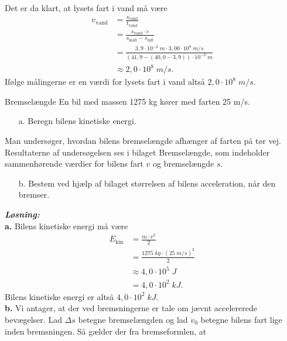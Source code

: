 \documentclass{report}
\newcommand{\sol}{\setlength{\parindent}{0cm}\textbf{\textit{Løsning:}}\setlength{\parindent}{1cm}}
\begin{document}
Det er da klart, at lysets fart i vand må være
\begin{equation*}
\begin{split}
  v _{\text{vand} }&=\frac{s _{\text{vand} }}{t _{\text{vand} }}\\
  &=\frac{s _{\text{vand} } \cdot c}{s _{\text{målt} } - s _{\text{luft} }}\\
  &=\frac{3,9 \cdot 10 ^{-2} \;\unit{m} \cdot 3,00 \cdot 10 ^{8} \;\unit{m/s} }{ \left(41,9 - (40,0-3,9)\right) \cdot 10 ^{-2}\;\unit{m} }\\
  &\approx 2,0 \cdot 10 ^{8} \;\unit{m/s}.
\end{split}
\end{equation*}
Ifølge målingerne er en værdi for lysets fart i vand altså $2,0 \cdot 10 ^{8} \;\unit{m/s} $.

\begin{question}{Bremselængde}{}
En bil med massen 1275 kg kører med farten 25 m/s.
\begin{itemize}
  \item[a.] Beregn bilens kinetiske energi.
\end{itemize}
Man undersøger, hvordan bilens bremselængde afhænger af farten på tør vej. Resultaterne af undersøgelsen ses i bilaget Bremselængde, som indeholder sammenhørende værdier for bilens fart $v$ og bremselængde $s$.
\begin{itemize}
  \item[b.] Bestem ved hjælp af bilaget størrelsen af bilens acceleration, når den bremser.
\end{itemize}
\end{question}
\sol \\
\textbf{a.}
Bilens kinetiske energi må være
\begin{equation*}
\begin{split}
  E _{\text{kin} }&= \frac{m \cdot v^2}{2}\\
  &=\frac{1275 \;\unit{kg} \cdot \left(25 \;\unit{m/s} \right) ^2}{2}\\
  &\approx 4,0 \cdot 10^5 \;\unit{J} \\
  &=4,0 \cdot 10^2 \;\unit{kJ}.
\end{split}
\end{equation*}
Bilens kinetiske energi er altså $4,0 \cdot 10^2 \;\unit{kJ} $.\\[1ex]
\textbf{b.}
Vi antager, at der ved bremsningerne er tale om jævnt accelererede bevægelser.
Lad $\Delta s$ betegne bremselængden og lad $v_0$ betegne bilens fart lige inden bremsningen.
Så gælder der fra bremseformlen, at
\end{document}
